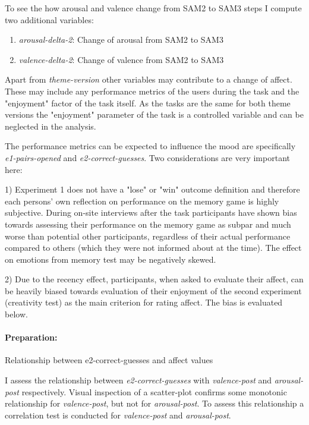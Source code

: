 	To see the how arousal and valence change from SAM2 to SAM3 steps I compute two additional variables:
	
	\begin{enumerate}
		\item \textit{arousal-delta-2}: Change of arousal from SAM2 to SAM3
		\item \textit{valence-delta-2}: Change of valence from SAM2 to SAM3
	\end{enumerate}
	
	Apart from \textit{theme-version} other variables may contribute to a change of affect. These may include any performance metrics of the users during the task and the "enjoyment" factor of the task itself. As the tasks are the same for both theme versions the "enjoyment" parameter of the task is a controlled variable and can be neglected in the analysis.
	
	The performance metrics can be expected to influence the mood are specifically \textit{e1-pairs-opened} and \textit{e2-correct-guesses}. Two considerations are very important here: 
	
	1) Experiment 1 does not have a "lose" or "win" outcome definition and therefore each persons' own reflection on performance on the memory game is highly subjective. During on-site interviews after the task participants have shown bias towards assessing their performance on the memory game as subpar and much worse than potential other participants, regardless of their actual performance compared to others (which they were not informed about at the time). The effect on emotions from memory test may be negatively skewed. 
	
	2) Due to the recency effect, participants, when asked to evaluate their affect, can be heavily biased towards evaluation of their enjoyment of the second experiment (creativity test) as the main criterion for rating affect. The bias is evaluated below.
	
	\paragraph{Preparation:} Relationship between e2-correct-guesses and affect values
	 
	I assess the relationship between \textit{e2-correct-guesses} with \textit{valence-post} and \textit{arousal-post} respectively. 
	Visual inspection of a scatter-plot confirms some monotonic relationship for \textit{valence-post}, but not for \textit{arousal-post}.
	To assess this relationship a correlation test is conducted for \textit{valence-post} and \textit{arousal-post}.
	
